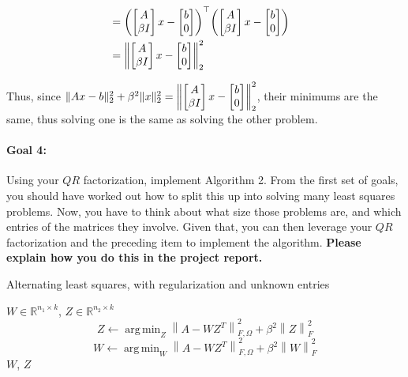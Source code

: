 \documentclass[11pt,onecolumn]{article}
\newcommand{\R}{\mathbb{R}}
\DeclareMathOperator*{\argmin}{arg\,min}
\DeclarePairedDelimiter{\norm}{\lVert}{\rVert}
\DeclarePairedDelimiter{\PAREN}{(}{)}
\newcommand{\bluebox}[1]{
  \begin{tcolorbox}[colback=blue!5!white,colframe=blue!75!black,boxrule=0.5pt,boxsep=0pt,left=6pt,right=16pt,top=4pt,bottom=4pt]
  #1
  \end{tcolorbox}   
}
\begin{document}
\begin{align*}
  \\ &=\PAREN*{\begin{bmatrix} A \\ \beta I\end{bmatrix}x - \begin{bmatrix}b \\ 0 \end{bmatrix}}^\top \PAREN*{\begin{bmatrix} A \\ \beta I\end{bmatrix}x - \begin{bmatrix}b \\ 0 \end{bmatrix}}
  \\ &=\norm*{\begin{bmatrix} A \\ \beta I\end{bmatrix}x - \begin{bmatrix}b \\ 0\end{bmatrix}}^2_2
\end{align*}

Thus, since $\norm{Ax-b}_2^2+\beta^2\norm x_2^2=\norm*{\begin{bmatrix} A \\ \beta I\end{bmatrix}x - \begin{bmatrix}b \\ 0\end{bmatrix}}^2_2$, their minimums are the same, thus solving one is the same as solving the other problem.


\bluebox{
\paragraph{Goal 4:}
Using your $QR$ factorization, implement Algorithm 2. From the first set of goals, you should have worked out how to split this up into solving many least squares problems. Now, you have to think about what size those problems are, and which entries of the matrices they involve. Given that, you can then leverage your $QR$ factorization and the preceding item to implement the algorithm. \textbf{Please explain how you do this in the project report.}}

\newpage
\begin{algorithm}
\caption{Alternating least squares, with regularization and unknown entries}
\label{alg:als2}
\begin{algorithmic}[1]
 $W \in \R^{n_1 \times k}$, $Z \in \R^{n_2 \times k}$
  \State $$Z \leftarrow \argmin_{Z}\left\|A - WZ^T\right\|^2_{F,\Omega} + \beta^2\left\|Z\right\|_F^2$$ 
  \State $$W \leftarrow \argmin_{W}\left\|A - WZ^T\right\|^2_{F,\Omega} + \beta^2\left\|W\right\|_F^2$$
\EndWhile
{} $W$, $Z$
\end{algorithmic}
\end{algorithm}
\end{document}
